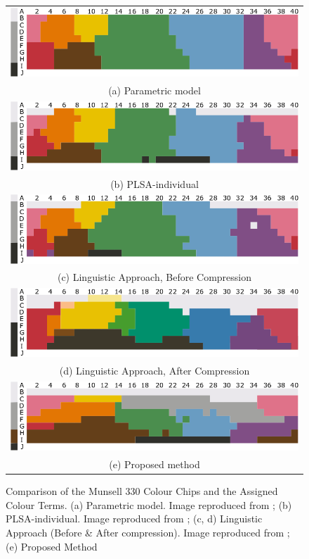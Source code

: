 \begin{figure}[htb!]
  \centering
\begin{tabular}{c}
 \includegraphics[width=0.7\linewidth]{image/analysis/munsell_a.png}   \\
 (a) Parametric model \\
 \includegraphics[width=0.7\linewidth]{image/analysis/munsell_b.png}   \\
 (b) PLSA-individual  \\
 \includegraphics[width=0.7\linewidth]{image/analysis/munsell_c.png}   \\
 (c) Linguistic Approach, Before Compression \\
 \includegraphics[width=0.7\linewidth]{image/analysis/munsell_e.png}  \\
 (d) Linguistic Approach, After Compression \\
 \includegraphics[width=0.7\linewidth]{image/analysis/munsell_d.png}   \\
 (e) Proposed method\\
\end{tabular}
\caption[Comparison of the Munsell 330 Colour Chips and the Assigned Colour Terms]{Comparison of the Munsell 330 Colour Chips and the Assigned Colour Terms. (a) Parametric model. Image reproduced from ; (b) PLSA-individual. Image reproduced from ; (c, d) Linguistic Approach (Before \& After compression). Image reproduced from ; (e) Proposed Method } \label{fig:munsell_compare}
\end{figure}


